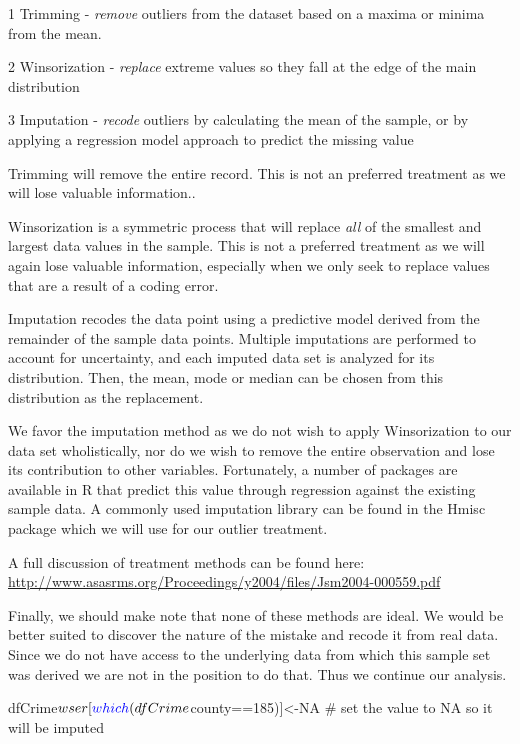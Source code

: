 \documentclass[]{article}
\newenvironment{Shaded}{}{}
\newcommand{\CommentTok}[1]{\textcolor[rgb]{0.00,0.50,0.00}{#1}}
\newcommand{\DecValTok}[1]{#1}
\newcommand{\KeywordTok}[1]{\textcolor[rgb]{0.00,0.00,1.00}{#1}}
\newcommand{\NormalTok}[1]{#1}
\newcommand{\OperatorTok}[1]{#1}
\newcommand{\OtherTok}[1]{\textcolor[rgb]{1.00,0.25,0.00}{#1}}
\begin{document}
1 Trimming - \emph{remove} outliers from the dataset based on a maxima
or minima from the mean.

2 Winsorization - \emph{replace} extreme values so they fall at the edge
of the main distribution

3 Imputation - \emph{recode} outliers by calculating the mean of the
sample, or by applying a regression model approach to predict the
missing value

Trimming will remove the entire record. This is not an preferred
treatment as we will lose valuable information..

Winsorization is a symmetric process that will replace \emph{all} of the
smallest and largest data values in the sample. This is not a preferred
treatment as we will again lose valuable information, especially when we
only seek to replace values that are a result of a coding error.

Imputation recodes the data point using a predictive model derived from
the remainder of the sample data points. Multiple imputations are
performed to account for uncertainty, and each imputed data set is
analyzed for its distribution. Then, the mean, mode or median can be
chosen from this distribution as the replacement.

We favor the imputation method as we do not wish to apply Winsorization
to our data set wholistically, nor do we wish to remove the entire
observation and lose its contribution to other variables. Fortunately, a
number of packages are available in R that predict this value through
regression against the existing sample data. A commonly used imputation
library can be found in the Hmisc package which we will use for our
outlier treatment.

A full discussion of treatment methods can be found here:
\url{http://www.asasrms.org/Proceedings/y2004/files/Jsm2004-000559.pdf}

Finally, we should make note that none of these methods are ideal. We
would be better suited to discover the nature of the mistake and recode
it from real data. Since we do not have access to the underlying data
from which this sample set was derived we are not in the position to do
that. Thus we continue our analysis.

\begin{Shaded}
\begin{Highlighting}[]
\NormalTok{dfCrime}\OperatorTok{$}\NormalTok{wser[}\KeywordTok{which}\NormalTok{(dfCrime}\OperatorTok{$}\NormalTok{county}\OperatorTok{==}\DecValTok{185}\NormalTok{)]<-}\OtherTok{NA} \CommentTok{# set the value to NA so it will be imputed}
\end{Highlighting}
\end{Shaded}
\end{document}

